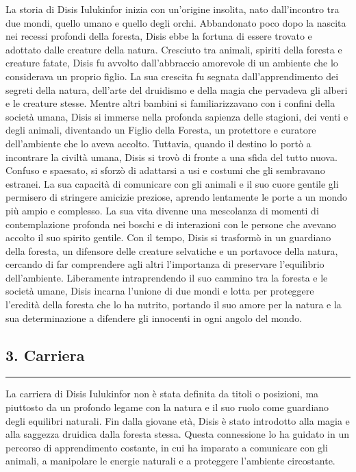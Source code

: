 La storia di Disis Iulukinfor inizia con un'origine insolita, nato
dall'incontro tra due mondi, quello umano e quello degli orchi.
Abbandonato poco dopo la nascita nei recessi profondi della foresta,
Disis ebbe la fortuna di essere trovato e adottato dalle creature della
natura. Cresciuto tra animali, spiriti della foresta e creature fatate,
Disis fu avvolto dall'abbraccio amorevole di un ambiente che lo
considerava un proprio figlio. La sua crescita fu segnata
dall'apprendimento dei segreti della natura, dell'arte del druidismo e
della magia che pervadeva gli alberi e le creature stesse. Mentre altri
bambini si familiarizzavano con i confini della società umana, Disis si
immerse nella profonda sapienza delle stagioni, dei venti e degli
animali, diventando un Figlio della Foresta, un protettore e curatore
dell'ambiente che lo aveva accolto. Tuttavia, quando il destino lo portò
a incontrare la civiltà umana, Disis si trovò di fronte a una sfida del
tutto nuova. Confuso e spaesato, si sforzò di adattarsi a usi e costumi
che gli sembravano estranei. La sua capacità di comunicare con gli
animali e il suo cuore gentile gli permisero di stringere amicizie
preziose, aprendo lentamente le porte a un mondo più ampio e complesso.
La sua vita divenne una mescolanza di momenti di contemplazione profonda
nei boschi e di interazioni con le persone che avevano accolto il suo
spirito gentile. Con il tempo, Disis si trasformò in un guardiano della
foresta, un difensore delle creature selvatiche e un portavoce della
natura, cercando di far comprendere agli altri l'importanza di
preservare l'equilibrio dell'ambiente. Liberamente intraprendendo il suo
cammino tra la foresta e le società umane, Disis incarna l'unione di due
mondi e lotta per proteggere l'eredità della foresta che lo ha nutrito,
portando il suo amore per la natura e la sua determinazione a difendere
gli innocenti in ogni angolo del mondo.

\subsection{3. Carriera}\label{carriera}

\begin{center}\rule{0.5\linewidth}{0.5pt}\end{center}

La carriera di Disis Iulukinfor non è stata definita da titoli o
posizioni, ma piuttosto da un profondo legame con la natura e il suo
ruolo come guardiano degli equilibri naturali. Fin dalla giovane età,
Disis è stato introdotto alla magia e alla saggezza druidica dalla
foresta stessa. Questa connessione lo ha guidato in un percorso di
apprendimento costante, in cui ha imparato a comunicare con gli animali,
a manipolare le energie naturali e a proteggere l'ambiente circostante.

